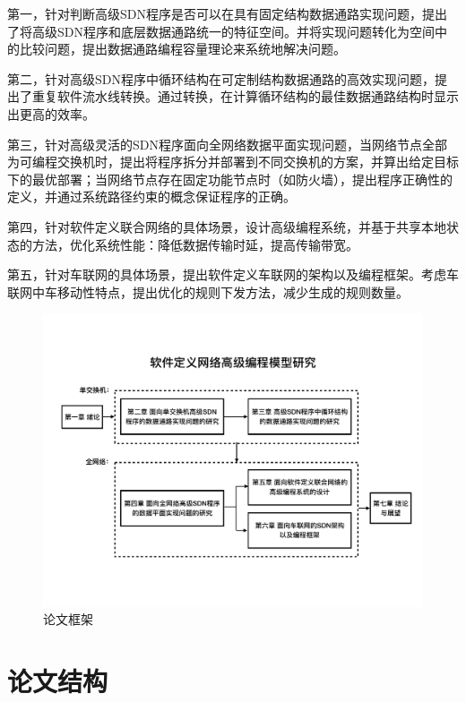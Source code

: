 第一，针对判断高级SDN程序是否可以在具有固定结构数据通路实现问题，提出了将高级SDN程序和底层数据通路统一的特征空间。并将实现问题转化为空间中的比较问题，提出数据通路编程容量理论来系统地解决问题。

第二，针对高级SDN程序中循环结构在可定制结构数据通路的高效实现问题，提出了重复软件流水线转换。通过转换，在计算循环结构的最佳数据通路结构时显示出更高的效率。

第三，针对高级灵活的SDN程序面向全网络数据平面实现问题，当网络节点全部为可编程交换机时，提出将程序拆分并部署到不同交换机的方案，并算出给定目标下的最优部署；当网络节点存在固定功能节点时（如防火墙），提出程序正确性的定义，并通过系统路径约束的概念保证程序的正确。

第四，针对软件定义联合网络的具体场景，设计高级编程系统，并基于共享本地状态的方法，优化系统性能：降低数据传输时延，提高传输带宽。

第五，针对车联网的具体场景，提出软件定义车联网的架构以及编程框架。考虑车联网中车移动性特点，提出优化的规则下发方法，减少生成的规则数量。

\begin{figure}[h!]
    \centering
    \includegraphics[width=0.9\linewidth]{figures/intro-fig1.pdf}
    \caption{论文框架}
    \label{intro:fig1}
\end{figure}


\section{论文结构}

